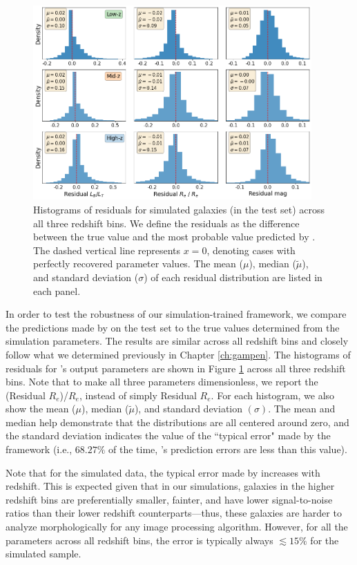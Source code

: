\begin{figure}[htb]
    \centering
    \includegraphics[width = 0.95\textwidth]{err_hist_sim_all_z.png}
    \caption{Histograms of residuals for simulated galaxies (in the test set) across all three redshift bins. We define the residuals as the difference between the true value and the most probable value predicted by \gampen{}. The dashed vertical line represents $x = 0$, denoting cases with perfectly recovered parameter values. 
    The mean ($\mu$), median ($\tilde{\mu}$), and standard deviation ($\sigma$) of each residual distribution are listed in each panel.}
    \label{fig_c3:resi_sim_all_z}
\end{figure}

In order to test the robustness of our simulation-trained framework, we compare the predictions made by \gampen{} on the test set to the true values determined from the simulation parameters. The results are similar across all redshift bins and closely follow what we determined previously in Chapter \ref{ch:gampen}. The histograms of residuals for \gampen{}'s output parameters are shown in Figure \ref{fig_c3:resi_sim_all_z} across all three redshift bins. Note that to make all three parameters dimensionless, we report the (Residual $R_e$)/$R_e$, instead of simply Residual $R_e$. For each histogram, we also show the mean ($\mu$), median ($\tilde{\mu}$), and standard deviation $(\sigma)$. The mean and median help demonstrate that the distributions are all centered around zero, and the standard deviation indicates the value of the ``typical error" made by the framework (i.e., $68.27\%$ of the time, \gampen{}'s prediction errors are less than this value).

Note that for the simulated data, the typical error made by \gampen{} increases with redshift. This is expected given that in our simulations, galaxies in the higher redshift bins are preferentially smaller, fainter, and have lower signal-to-noise ratios than their lower redshift counterparts---thus, these galaxies are harder to analyze morphologically for any image processing algorithm. However, for all the parameters across all redshift bins, the \gampen{} error is typically always $\lesssim 15\%$ for the simulated sample.

